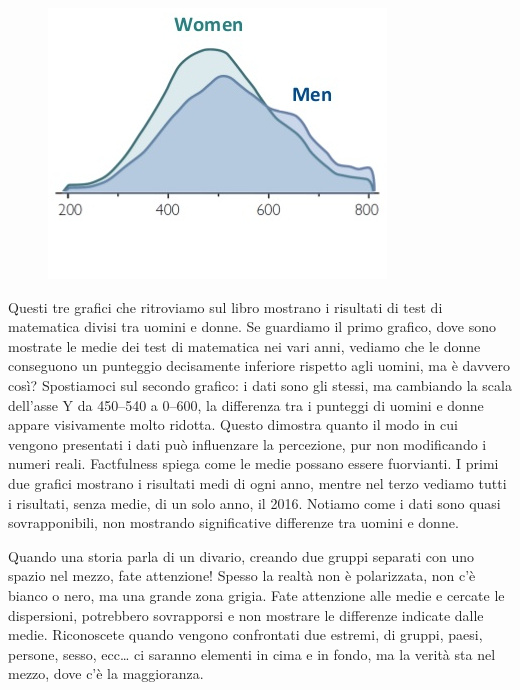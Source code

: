 \documentclass[12pt]{book} %
\begin{document}
\begin{figure}[H]
\begin{minipage}{0.3\textwidth}
    \end{minipage}
    \hfill
    \begin{minipage}{0.3\textwidth}
        \centering
        \includegraphics[width=\linewidth]{images/Libro-img004.jpg}
    \end{minipage}
\end{figure}

Questi tre grafici che ritroviamo sul libro mostrano i risultati di test di matematica divisi tra uomini e donne. Se
guardiamo il primo grafico, dove sono mostrate le medie dei test di matematica nei vari anni, vediamo che le donne
conseguono un punteggio decisamente inferiore rispetto agli uomini, ma è davvero così? Spostiamoci sul secondo grafico: i dati sono gli stessi, ma cambiando la scala dell’asse Y da 450–540 a 0–600, la differenza tra i punteggi di uomini e donne appare visivamente molto ridotta. Questo dimostra quanto il modo in cui vengono presentati i dati può influenzare la percezione, pur non modificando i numeri reali. Factfulness spiega come le medie possano essere fuorvianti. I primi due grafici mostrano i risultati medi di ogni
anno, mentre nel terzo vediamo tutti i risultati, senza medie, di un solo anno, il 2016. Notiamo come i dati sono quasi
sovrapponibili, non mostrando significative differenze tra uomini e donne.

Quando una storia parla di un divario, creando due gruppi separati con uno spazio nel mezzo, fate attenzione! Spesso la
realtà non è polarizzata, non c'è bianco o nero, ma una grande zona grigia. Fate attenzione alle
medie e cercate le dispersioni, potrebbero sovrapporsi e non mostrare le differenze indicate dalle medie. Riconoscete
quando vengono confrontati due estremi, di gruppi, paesi, persone, sesso, ecc… ci saranno elementi in cima e in
fondo, ma la verità sta nel mezzo, dove c'è la maggioranza.
\end{document}
